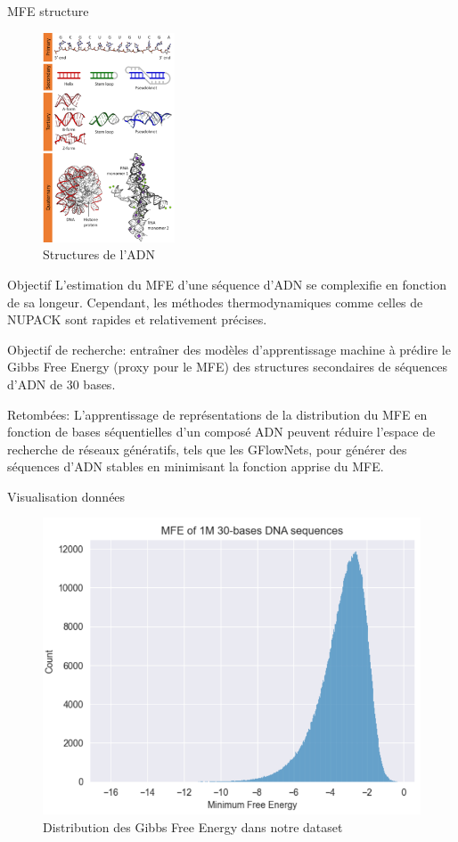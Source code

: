 \documentclass{beamer}
\begin{document}
\begin{frame}{MFE structure}

\begin{figure} \label{fig:ADN_structure}
    \caption{Structures de l'ADN} \center
    \includegraphics[width=0.35\textwidth]{images/DNA_structure.png}
\end{figure}

\end{frame}

\begin{frame}{Objectif}
L'estimation du MFE d'une séquence d'ADN se complexifie en fonction de sa longeur. Cependant, les méthodes thermodynamiques comme celles de NUPACK sont rapides et relativement précises.

Objectif de recherche: entraîner des modèles d'apprentissage machine à prédire le Gibbs Free Energy (proxy pour le MFE) des structures secondaires de séquences d'ADN de 30 bases.

Retombées: L'apprentissage de représentations de la distribution du MFE en fonction de bases séquentielles d'un composé ADN peuvent réduire l'espace de recherche de réseaux génératifs, tels que les GFlowNets, pour générer des séquences d'ADN stables en minimisant la fonction apprise du MFE.

\end{frame}

\begin{frame}{Visualisation données}

\begin{figure} \label{fig:MFE_nupack}
    \caption{Distribution des Gibbs Free Energy dans notre dataset} \center
    \includegraphics[width=.7\textwidth]{images/MFE_nupack.png}
\end{figure}

\end{frame}
\end{document}
